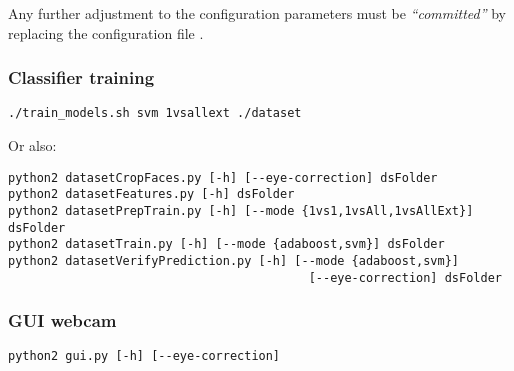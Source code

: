 Any further adjustment to the configuration parameters must be
\emph{``committed''} by replacing the configuration file
.

\subsubsection*{Classifier training}

\begin{verbatim}
./train_models.sh svm 1vsallext ./dataset
\end{verbatim}

Or also:

\begin{verbatim}
python2 datasetCropFaces.py [-h] [--eye-correction] dsFolder
python2 datasetFeatures.py [-h] dsFolder
python2 datasetPrepTrain.py [-h] [--mode {1vs1,1vsAll,1vsAllExt}] dsFolder
python2 datasetTrain.py [-h] [--mode {adaboost,svm}] dsFolder
python2 datasetVerifyPrediction.py [-h] [--mode {adaboost,svm}]
                                          [--eye-correction] dsFolder
\end{verbatim}

\subsubsection*{GUI webcam}

\begin{verbatim}
python2 gui.py [-h] [--eye-correction]
\end{verbatim}
